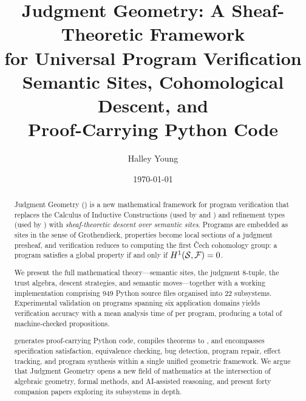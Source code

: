\documentclass[11pt]{article}
\title{\textbf{Judgment Geometry: A Sheaf-Theoretic Framework\\
for Universal Program Verification}\\[6pt]
\large Semantic Sites, Cohomological Descent, and\\
Proof-Carrying Python Code}
\author{Halley Young}
\date{\today}
\begin{document}
\maketitle

\begin{abstract}
Judgment Geometry (\JuGeo) is a new mathematical framework for program
verification that replaces the Calculus of Inductive Constructions (used by
\LEAN{} and \Coq) and refinement types (used by \Fstar) with
\emph{sheaf-theoretic descent over semantic sites}.  Programs are embedded as
sites in the sense of Grothendieck, properties become local sections of a
judgment presheaf, and verification reduces to computing the first \v{C}ech
cohomology group: a program satisfies a global property if and only if
$H^{1}(\mathcal{S},\mathcal{F})=0$.

We present the full mathematical theory---semantic sites, the judgment
8-tuple, the trust algebra, descent strategies, and semantic
moves---together with a working implementation comprising 949 Python source
files organised into 22 subsystems.  Experimental validation on
\expTotalPrograms{} programs spanning six application domains yields
\expAccuracy{} verification accuracy with a mean analysis time of
\expTimeMean{} per program, producing a total of \expPropsSum{}
machine-checked propositions.

\JuGeo{} generates proof-carrying Python code, compiles theorems to
\LEAN, and encompasses specification satisfaction, equivalence checking,
bug detection, program repair, effect tracking, and program synthesis
within a single unified geometric framework.  We argue that Judgment
Geometry opens a new field of mathematics at the intersection of algebraic
geometry, formal methods, and AI-assisted reasoning, and present forty
companion papers exploring its subsystems in depth.
\end{abstract}

\newpage






\end{document}
